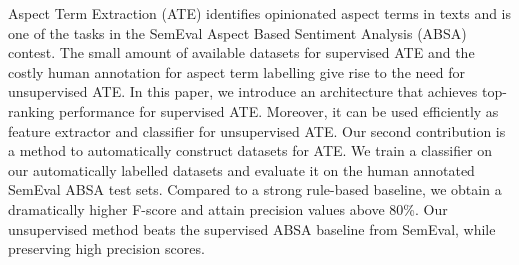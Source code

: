 Aspect Term Extraction (ATE) identifies opinionated aspect terms in texts and is one of the tasks in the SemEval Aspect Based Sentiment Analysis (ABSA) contest. The small amount of available datasets for supervised ATE and the costly human annotation for aspect term labelling give rise to the need for unsupervised ATE. In this paper, we introduce an architecture that achieves top-ranking performance for supervised ATE. Moreover, it can be used efficiently as feature extractor and classifier for unsupervised ATE. Our second contribution is a method to automatically construct datasets for ATE. We train a classifier on our automatically labelled datasets and evaluate it on the human annotated SemEval ABSA test sets. Compared to a strong rule-based baseline, we obtain a dramatically higher F-score and attain precision values above 80\%. Our unsupervised method beats the supervised ABSA baseline from SemEval, while preserving high precision scores.
